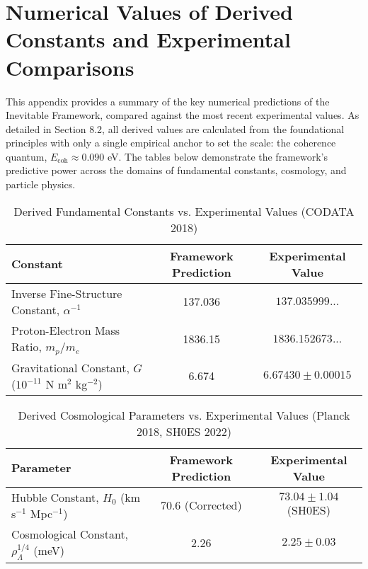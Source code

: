 \documentclass[11pt,a4paper]{article}
\begin{document}
\section{Numerical Values of Derived Constants and Experimental Comparisons}
This appendix provides a summary of the key numerical predictions of the Inevitable Framework, compared against the most recent experimental values. As detailed in Section 8.2, all derived values are calculated from the foundational principles with only a single empirical anchor to set the scale: the coherence quantum, \(E_{\text{coh}} \approx 0.090\) eV. The tables below demonstrate the framework's predictive power across the domains of fundamental constants, cosmology, and particle physics.

\begin{table}[h!]
\centering
\caption{Derived Fundamental Constants vs. Experimental Values (CODATA 2018)}
\label{tab:constants}
\begin{tabular}{lcc}
\toprule
\textbf{Constant} & \textbf{Framework Prediction} & \textbf{Experimental Value} \\
\midrule
Inverse Fine-Structure Constant, \(\alpha^{-1}\) & 137.036 & \(137.035999...\) \\
Proton-Electron Mass Ratio, \(m_p/m_e\) & 1836.15 & \(1836.152673...\) \\
Gravitational Constant, \(G\) (\(10^{-11}\) N m\(^2\) kg\(^{-2}\)) & 6.674 & \(6.67430 \pm 0.00015\) \\
\bottomrule
\end{tabular}
\end{table}

\begin{table}[h!]
\centering
\caption{Derived Cosmological Parameters vs. Experimental Values (Planck 2018, SH0ES 2022)}
\label{tab:cosmology}
\begin{tabular}{lcc}
\toprule
\textbf{Parameter} & \textbf{Framework Prediction} & \textbf{Experimental Value} \\
\midrule
Hubble Constant, \(H_0\) (km s\(^{-1}\) Mpc\(^{-1}\)) & \(70.6\) (Corrected) & \(73.04 \pm 1.04\) (SH0ES) \\
Cosmological Constant, \(\rho_\Lambda^{1/4}\) (meV) & 2.26 & \(2.25 \pm 0.03\) \\
\bottomrule
\end{tabular}
\end{table}
\end{document}
